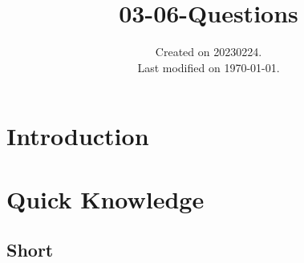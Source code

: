 \documentclass[UTF8]{../03-Chemistry}
\begin{document}
\title{03-06-Questions}
\date{Created on 20230224.\\   Last modified on \today.}
\maketitle
\tableofcontents


\chapter{Introduction}


\chapter{Quick Knowledge}

\section{Short}
\end{document}
